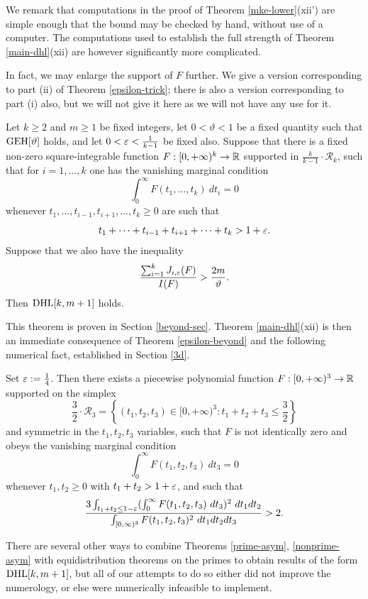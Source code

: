We remark that computations in the proof of Theorem \ref{mke-lower}(xii') are simple enough that the bound may be checked by hand, without use of a computer.  The computations used to establish the full strength of Theorem \ref{main-dhl}(xii) are however significantly more complicated.  

In fact, we may enlarge the support of $F$ further.  We give a version corresponding to part (ii) of Theorem \ref{epsilon-trick}; there is also a version corresponding to part (i) also, but we will not give it here as we will not have any use for it.

\begin{theorem}\label{epsilon-beyond}  Let $k \geq 2$ and $m \geq 1$ be fixed integers, let $0 <\vartheta < 1$ be a fixed quantity such that $\operatorname*{GEH}[\vartheta]$ holds, and let $0 < \varepsilon < \frac{1}{k-1}$ be fixed also. Suppose that there is a fixed non-zero square-integrable function $F: [0,+\infty)^k \to \mathbb{R}$ supported in $\frac{k}{k-1} \cdot {\mathcal R}_k$, such that for $i=1,\dots,k$ one has the vanishing marginal condition
\begin{equation}\label{vanishing-marginal}
\int_0^\infty F(t_1,\dots,t_k)\ dt_i = 0
\end{equation}
 whenever $t_1,\dots,t_{i-1},t_{i+1},\dots,t_k \geq 0$ are such that
$$ t_1+\dots+t_{i-1}+t_{i+1}+\dots+t_k > 1+\varepsilon.$$
Suppose that we also have the inequality
$$ \frac{\sum_{i=1}^k J_{i,\varepsilon}(F)}{I(F)} > \frac{2m}{\vartheta}.$$
Then $\operatorname*{DHL}[k,m+1]$ holds.
\end{theorem}

This theorem is proven in Section \ref{beyond-sec}.  Theorem \ref{main-dhl}(xii) is then an immediate consequence of Theorem \ref{epsilon-beyond} and the following numerical fact, established in Section \ref{3d}.

\begin{theorem}\label{piece}  Set $\varepsilon := \frac{1}{4}$.  Then there exists a piecewise polynomial function $F: [0,+\infty)^3 \to \mathbb{R}$ supported on the simplex
$$ \frac{3}{2} \cdot {\mathcal R}_3 = \left\{ (t_1,t_2,t_3) \in [0,+\infty)^3: t_1+t_2+t_3 \leq \frac{3}{2}\right\}$$
and symmetric in the $t_1,t_2,t_3$ variables, such that $F$ is not identically zero and obeys the vanishing marginal condition
$$
\int_0^\infty F(t_1,t_2,t_3)\ dt_3 = 0$$
whenever $t_1,t_2 \geq 0$ with $t_1+t_2 > 1+\varepsilon$, and such that
$$ \frac{3 \int_{t_1+t_2 \leq 1-\varepsilon} (\int_0^\infty F(t_1,t_2,t_3)\ dt_3)^2\ dt_1 dt_2}{\int_{[0,\infty)^3} F(t_1,t_2,t_3)^2\ dt_1 dt_2 dt_3} > 2.$$
\end{theorem}

There are several other ways to combine Theorems \ref{prime-asym}, \ref{nonprime-asym} with equidistribution theorems on the primes to obtain results of the form $\operatorname*{DHL}[k,m+1]$, but all of our attempts to do so either did not improve the numerology, or else were numerically infeasible to implement. 